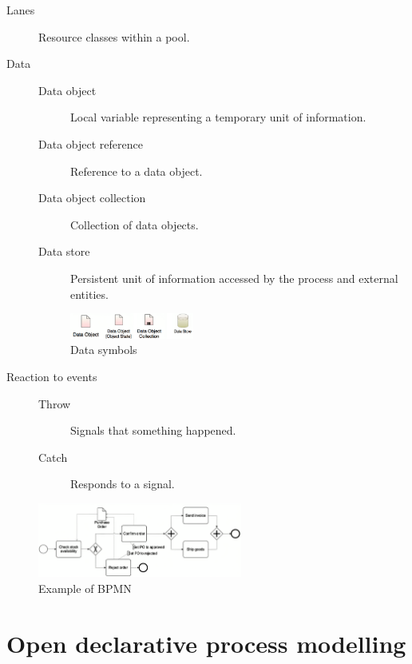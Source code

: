 \begin{description}
    \item[Lanes] 
        Resource classes within a pool.
    
    \item[Data]  \phantom{}
        \begin{description}
            \item[Data object] Local variable representing a temporary unit of information.
            \item[Data object reference] Reference to a data object.
            \item[Data object collection] Collection of data objects.
            \item[Data store] Persistent unit of information accessed by the process and external entities.
        \end{description}
        \begin{figure}[H]
            \centering
            \includegraphics[width=0.4\textwidth]{img/bpmn_data.png}
            \caption{Data symbols}
        \end{figure}

    \item[Reaction to events]  \phantom{}
        \begin{description}
            \item[Throw] Signals that something happened. 
            \item[Catch] Responds to a signal.
        \end{description}
\end{description}

\begin{figure}[H]
    \centering
    \includegraphics[width=0.6\textwidth]{img/bpmn_example1.png}
    \caption{Example of BPMN}
\end{figure}



\section{Open declarative process modelling}

